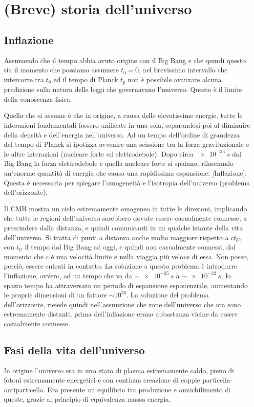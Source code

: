 \section{(Breve) storia dell'universo}\label{sec:storia-universo}
\subsection{Inflazione}\label{inflazione}
Assumendo che il tempo abbia avuto origine con il Big Bang e che quindi questo sia il momento che possiamo assumere $t_0=0$, nel brevissimo intervallo che intercorre tra $t_0$ ed il tempo di Planck $t_p$ non è possibile avanzare alcuna predizione sulla natura delle leggi che governavano l'universo. Questo è il limite della conoscenza fisica.

Quello che si assume è che in origine, a causa delle elevatissime energie, tutte le interazioni fondamentali fossero unificate in una sola, separandosi poi al diminuire della densità e dell'energia nell'universo. Ad un tempo dell'ordine di grandezza del tempo di Planck si ipotizza avvenire una scissione tra la forza gravitazionale e le altre interazioni (nucleare forte ed elettrodebole). Dopo circa $\SI{e-35}{s}$ dal Big Bang la forza elettrodebole e quella nucleare forte si spaiano, rilasciando un'enorme quantità di energia che causa una rapidissima espansione: \textit[Inflazione]. Questa è necessaria per spiegare l'omogeneità e l'isotropia dell'universo (problema dell'orizzonte).

Il CMB mostra un cielo estremamente omogeneo in tutte le direzioni, implicando che tutte le regioni dell'universo sarebbero dovute essere casualmente connesse, a prescindere dalla distanza, e quindi comunicanti in un qualche istante della vita dell'universo. Si tratta di punti a distanza anche molto maggiore rispetto a $ct_U$, con $t_U$ il tempo dal Big Bang ad oggi, e quindi non casualmente connessi, dal momento che $c$ è una velocità limite e nulla viaggia più veloce di essa. Non posso, perciò, essere entrati in contatto. La soluzione a questo problema è introdurre l'inflazione, ovvero, ad un tempo che va da $\sim \SI{e-35}{s}$ a $\sim \SI{e-32}{s}$, lo spazio tempo ha attraversato un periodo di espansione esponenziale, aumentando le proprie dimensioni di un fattore $\sim 10^{50}$. La soluzione del problema dell'orizzonte, rieiede quindi nell'assunzione che zone dell'universo che ora sono estremamente distanti, prima dell'inflazione erano abbastanza vicine da essere casualmente connesse.

\subsection{Fasi della vita dell'universo}\label{sec:fasi-universo}
In origine l'universo era in uno stato di plasma estremamente caldo, pieno di fotoni estremamente energetici e con continua creazione di coppie particella-antiparticella. Era presente un equilibrio tra produzione e annichilimento di queste, grazie al principio di equivalenza massa energia. 

